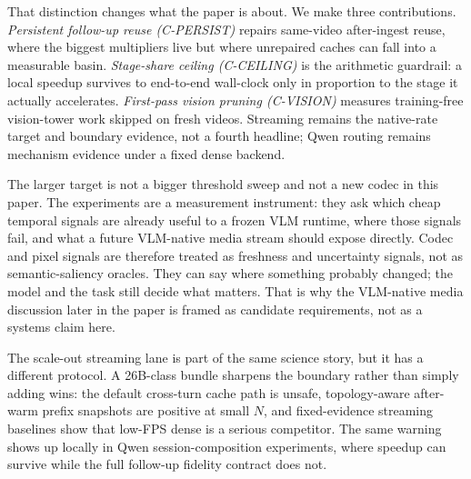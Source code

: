 That distinction changes what the paper is about. We make three contributions.
\emph{Persistent follow-up reuse (C-PERSIST)} repairs same-video after-ingest
reuse, where the biggest multipliers live but where unrepaired caches can fall
into a measurable basin. \emph{Stage-share ceiling (C-CEILING)} is the
arithmetic guardrail: a local speedup survives to end-to-end wall-clock only in
proportion to the stage it actually accelerates. \emph{First-pass vision
pruning (C-VISION)} measures training-free vision-tower work skipped on fresh
videos. Streaming remains the native-rate target and boundary evidence, not a
fourth headline; Qwen routing remains mechanism evidence under a fixed dense
backend.

The larger target is not a bigger threshold sweep and not a new codec in this
paper. The experiments are a measurement instrument: they ask which
cheap temporal signals are already useful to a frozen VLM runtime, where those
signals fail, and what a future VLM-native media stream should expose directly.
Codec and pixel signals are therefore treated as freshness and uncertainty
signals, not as semantic-saliency oracles. They can say where something
probably changed; the model and the task still decide what matters. That is
why the VLM-native media discussion later in the paper is framed as candidate
requirements, not as a systems claim here.

The scale-out streaming lane is part of the same science story, but it has a
different protocol. A 26B-class bundle sharpens the boundary rather than simply
adding wins: the default cross-turn cache path is unsafe, topology-aware
after-warm prefix snapshots are positive at small \(N\), and fixed-evidence
streaming baselines show that low-FPS dense is a serious competitor. The same warning
shows up locally in Qwen session-composition experiments, where speedup can
survive while the full follow-up fidelity contract does not.

